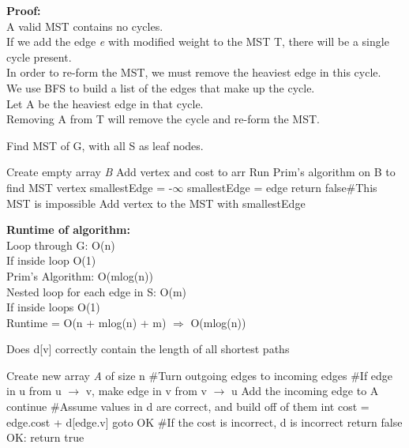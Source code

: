 \documentclass[12pt]{article}
\begin{document}
\noindent \textbf{Proof:}\\
A valid MST contains no cycles.\\
If we add the edge \textit{e} with modified weight to the MST T, there will be a  single cycle present.\\
In order to re-form the MST, we must remove the heaviest edge in this cycle.\\
We use BFS to build a list of the edges that make up the cycle.\\
Let A be the heaviest edge in that cycle.\\
Removing A from T will remove the cycle and re-form the MST.\\




\begin{algorithm}[H]
\caption{Find MST of G, with all S as leaf nodes.}
\begin{algorithmic}
\State Create empty array \textit{B}
\State Add vertex and cost to arr
\EndIf
\EndFor
\State Run Prim's algorithm on B to find MST
\State vertex smallestEdge = -$\infty$
\State smallestEdge = edge
\EndIf
\EndIf
{}
\State return false\indent \#This MST is impossible
\EndIf
\State Add vertex to the MST with smallestEdge
\EndFor
\EndFor
\end{algorithmic}
\end{algorithm}

\noindent \textbf{Runtime of algorithm:} \\
Loop through G: O(n)\\
\indent If inside loop O(1)\\
Prim's Algorithm: O(mlog(n))\\
Nested loop for each edge in S: O(m)\\
\indent If inside loops O(1)\\
Runtime = O(n + mlog(n) + m) $\Rightarrow$ O(mlog(n))\\


\begin{algorithm}[H]
\caption{Does d[v] correctly contain the length of all shortest paths}
\begin{algorithmic}
\State Create new array \textit{A} of size n
\State \#Turn outgoing edges to incoming edges
\State \#If edge in u from u $\to$ v, make edge in v from v $\to$ u
\State Add the incoming edge to A
\EndFor
\EndFor
{}
\State continue
\EndIf
{}
\State \#Assume values in d are correct, and build off of them
\State int cost = edge.cost + d[edge.v]
\State goto OK
\EndIf
\EndFor
\State \#If the cost is incorrect, d is incorrect
\State return false
\State OK:
\EndFor
\State return true
\end{algorithmic}
\end{algorithm}
\end{document}
